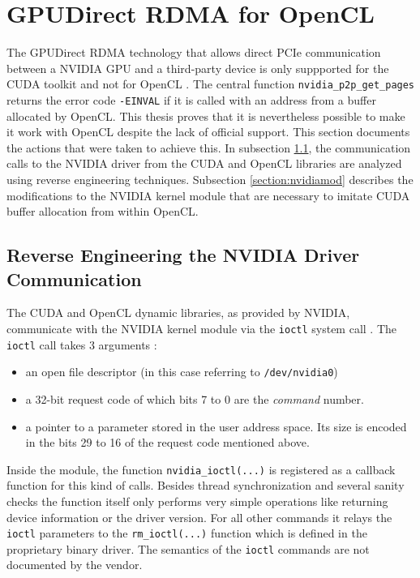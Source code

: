 \section{GPUDirect RDMA for OpenCL}
\label{section:cl_rdma}

The GPUDirect RDMA technology that allows direct PCIe communication between a NVIDIA GPU and a third-party device is only suppported for the CUDA toolkit and not for OpenCL \cite{rdma}.
The central function \texttt{nvidia\_p2p\_get\_pages} returns the error code \texttt{-EINVAL} if it is called with an address from a buffer allocated by OpenCL.
This thesis proves that it is nevertheless possible to make it work with OpenCL despite the lack of official support.
This section documents the actions that were taken to achieve this.
In subsection \ref{section:reverse}, the communication calls to the NVIDIA driver from the CUDA and OpenCL libraries are analyzed using reverse engineering techniques.
Subsection \ref{section:nvidiamod} describes the modifications to the NVIDIA kernel module that are necessary to imitate CUDA buffer allocation from within OpenCL.



\subsection{Reverse Engineering the NVIDIA Driver Communication}
\label{section:reverse}


The CUDA and OpenCL dynamic libraries, as provided by NVIDIA, communicate with the NVIDIA kernel module via the \texttt{ioctl} system call \cite{nvidia_driver}.
The \texttt{ioctl} call takes 3 arguments \cite{ioctl}:
\begin{itemize}
	\item an open file descriptor (in this case referring to \texttt{/dev/nvidia0})
	\item a 32-bit request code of which bits 7 to 0 are the \emph{command} number.
		\item a pointer to a parameter stored in the user address space. Its size is encoded in the bits 29 to 16 of the request code mentioned above.
\end{itemize}
Inside the module, the function \texttt{nvidia\_ioctl(...)} is registered as a callback function for this kind of calls.
Besides thread synchronization and several sanity checks the function itself only performs very simple operations like returning device information or the driver version.
For all other commands it relays the \texttt{ioctl} parameters to the \texttt{rm\_ioctl(...)} function which is defined in the  proprietary binary driver.
The semantics of the \texttt{ioctl} commands are not documented by the vendor.


